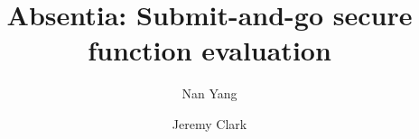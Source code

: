 \documentclass[envcountsect]{llncs}
\begin{document}
\frontmatter
\mainmatter

\title{\Large \bf Absentia: Submit-and-go secure function evaluation}

\author{
	Nan Yang \and Jeremy Clark
	}


\maketitle












\clearpage
\appendix
\end{document}
